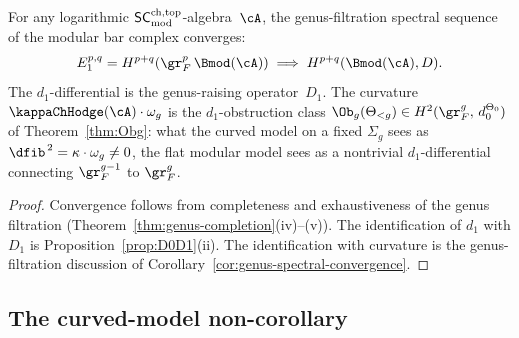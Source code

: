 \begin{corollary}
\label{cor:genus-spectral-convergence}
For any logarithmic $\mathsf{SC}^{\mathrm{ch,top}}_{\mathrm{mod}}$-algebra~$\cA$, the genus-filtration
spectral sequence of the modular bar complex converges:
\[
 E_1^{p,q}
 = H^{p+q}(\gr_F^p\, \Bmod(\cA))
 \;\Longrightarrow\;
 H^{p+q}(\Bmod(\cA), D).
\]
The $d_1$-differential is the genus-raising operator~$D_1$. The
curvature $\kappaChHodge(\cA) \cdot \omega_g$ is the $d_1$-obstruction
class
$\Ob_g(\Theta_{<g}) \in H^2(\gr_F^g,\, d_0^{\Theta_0})$
of Theorem~\textup{\ref{thm:Obg}}: what the curved model on a
fixed $\Sigma_g$ sees as $\dfib^{\,2} = \kappa \cdot \omega_g
\neq 0$, the flat modular model sees as a nontrivial
$d_1$-differential connecting $\gr_F^{g-1}$ to $\gr_F^g$.
\end{corollary}

\begin{proof}
Convergence follows from completeness and exhaustiveness of
the genus filtration (Theorem~\ref{thm:genus-completion}(iv)--(v)).
The identification of $d_1$ with $D_1$ is
Proposition~\ref{prop:D0D1}(ii). The identification with
curvature is the genus-filtration discussion of
Corollary~\ref{cor:genus-spectral-convergence}.
\end{proof}


\subsection{The curved-model non-corollary}
\label{subsec:curved-non-corollary}

